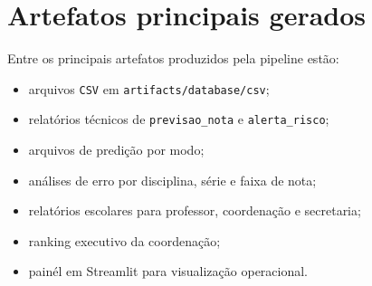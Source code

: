 \section{Artefatos principais gerados}

Entre os principais artefatos produzidos pela pipeline est\~ao:

\begin{itemize}
    \item arquivos \texttt{CSV} em \texttt{artifacts/database/csv};
    \item relat\'orios t\'ecnicos de \texttt{previsao\_nota} e \texttt{alerta\_risco};
    \item arquivos de predi\c{c}\~ao por modo;
    \item an\'alises de erro por disciplina, s\'erie e faixa de nota;
    \item relat\'orios escolares para professor, coordena\c{c}\~ao e secretaria;
    \item ranking executivo da coordena\c{c}\~ao;
    \item pain\'el em Streamlit para visualiza\c{c}\~ao operacional.
\end{itemize}
